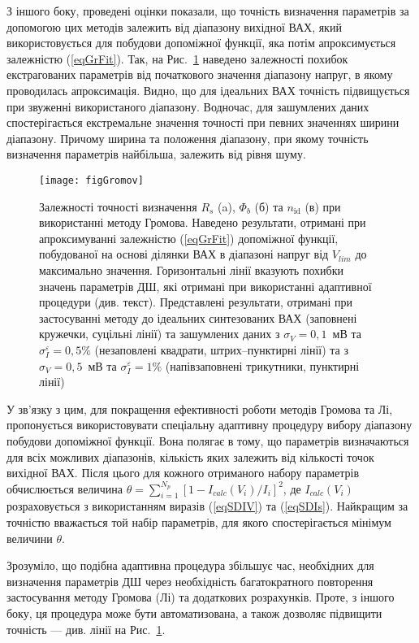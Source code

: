 З іншого боку, проведені оцінки показали, що точність визначення параметрів за допомогою цих методів залежить від діапазону вихідної ВАХ, який використовується для побудови допоміжної функції, яка потім апроксимується залежністю (\ref{eqGrFit}).
Так, на Рис.~\ref{figGromov} наведено залежності похибок екстрагованих параметрів від початкового значення діапазону напруг, в якому проводилась апроксимація.
Видно, що для ідеальних ВАХ точність підвищується при звуженні використаного діапазону.
Водночас, для зашумлених даних спостерігається екстремальне значення точності  при певних значеннях ширини діапазону.
Причому ширина та положення діапазону, при якому точність визначення параметрів найбільша, залежить від рівня шуму.



\begin{figure}
\center
\texttt{[image: figGromov]}%
\caption{\label{figGromov}
Залежності точності визначення $R_s$ (a), $\Phi_b$ (б) та $n_\mathrm{id}$ (в) при використанні методу Громова.
Наведено результати, отримані при апроксимуванні залежністю (\ref{eqGrFit}) допоміжної функції, побудованої
на основі ділянки ВАХ в діапазоні напруг від $V_{lim}$ до максимально значення.
Горизонтальні лінії вказують похибки значень параметрів ДШ, які отримані при використанні адаптивної процедури (див. текст).
Представлені результати, отримані при застосуванні методу до ідеальних синтезованих ВАХ (заповнені кружечки, суцільні лінії) та зашумлених даних
з $\sigma_V=0,1$~мВ та $\sigma_I^\varepsilon=0,5\%$ (незаповлені квадрати, штрих--пунктирні лінії) та з $\sigma_V=0,5$~мВ та $\sigma_I^\varepsilon=1\%$
(напівзаповнені трикутники, пунктирні лінії)
}
\end{figure}

У зв'язку з цим, для покращення ефективності роботи методів Громова та Лі, пропонується використовувати спеціальну адаптивну процедуру вибору діапазону побудови допоміжної функції.
Вона полягає в тому, що параметрів визначаються для всіх можливих діапазонів, кількість яких залежить від кількості точок вихідної ВАХ.
Після цього для кожного отриманого набору параметрів обчислюється величина $\theta=\sum_{i=1}^{N_p}[1-I_{calc}(V_i)/I_i]^2$,
де $I_{calc}(V_i)$ розраховується з використанням виразів (\ref{eqSDIV}) та (\ref{eqSDIs}).
Найкращим за точністю вважається той набір параметрів, для якого спостерігається мінімум величини $\theta$.

Зрозуміло, що подібна адаптивна процедура збільшує час, необхідних для визначення параметрів ДШ через необхідність багатократного повторення застосування методу Громова (Лі) та додаткових розрахунків.
Проте, з іншого боку, ця процедура може бути автоматизована, а також дозволяє підвищити точність --- див. лінії на Рис.~\ref{figGromov}.

